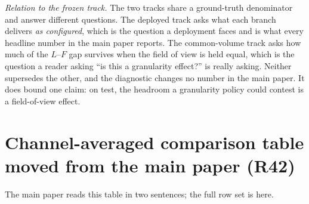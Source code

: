 \documentclass[journal]{IEEEtran}
\begin{document}
\emph{Relation to the frozen track.} The two tracks share a ground-truth denominator and answer
different questions. The deployed track asks what each branch delivers \emph{as configured}, which is
the question a deployment faces and is what every headline number in the main paper reports. The
common-volume track asks how much of the $L$--$F$ gap survives when the field of view is held equal,
which is the question a reader asking ``is this a granularity effect?'' is really asking. Neither
supersedes the other, and the diagnostic changes no number in the main paper. It does bound one
claim: on test, the headroom a granularity policy could contest is a field-of-view effect.

\section{Channel-averaged comparison table moved from the main paper (R42)}\label{sec:moved_r42}
The main paper reads this table in two sentences; the full row set is here.
\end{document}
